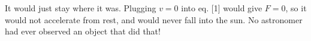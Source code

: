 It would just stay where it was. Plugging 
$v=0$ into eq. [1] would give $F=0$, so it would not accelerate from rest, and
would never fall into the sun. No astronomer had ever observed an object that did that!



